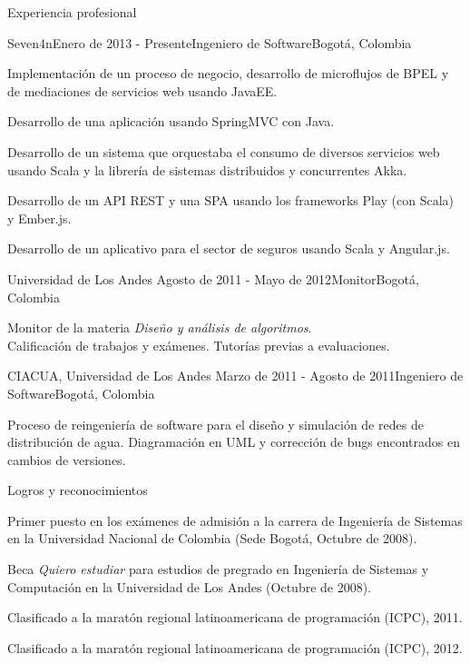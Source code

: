 \documentclass{resume} %
\def\uniandes{Universidad de Los Andes }
\begin{document}
\begin{rSection}{Experiencia profesional}

\begin{rSubsection}{Seven4n}{Enero de 2013 - Presente}{Ingeniero de Software}{Bogot\'a, Colombia}
\item Implementaci\'on de un proceso de negocio, desarrollo de microflujos de BPEL y de mediaciones de servicios web usando JavaEE.
\item Desarrollo de una aplicación usando SpringMVC con Java. 
\item Desarrollo de un sistema que orquestaba el consumo de diversos servicios web usando Scala y la librer\'ia de sistemas distribuidos y concurrentes Akka.
\item Desarrollo de un API REST y una SPA usando los frameworks Play (con Scala) y Ember.js. 
\item Desarrollo de un aplicativo para el sector de seguros usando Scala y Angular.js.
\end{rSubsection}


\begin{rSubsection}{\uniandes}{Agosto de 2011 - Mayo de 2012}{Monitor}{Bogot\'a, Colombia}
\item Monitor de la materia \textit{Dise\~{n}o y an\'alisis de algoritmos}.\\
Calificaci\'on de trabajos y ex\'amenes. Tutor\'ias previas a evaluaciones.
\end{rSubsection}


\begin{rSubsection}{CIACUA, \uniandes}{Marzo de 2011 - Agosto de 2011}{Ingeniero de Software}{Bogot\'a, Colombia}
\item Proceso de reingenier\'ia de software para el dise\~{n}o y simulaci\'on de redes de distribuci\'on de agua. Diagramaci\'on en UML y correcci\'on de bugs encontrados en cambios de versiones.
\end{rSubsection}

\end{rSection}

\begin{rSection}{Logros y reconocimientos}
\begin{rSubsection}{}{}{}{}
\item Primer puesto en los ex\'amenes de admisi\'on a la carrera de Ingenier\'ia de Sistemas en la Universidad Nacional de Colombia (Sede Bogot\'a, Octubre de 2008).
\item Beca \textsl{Quiero estudiar} para estudios de pregrado en Ingenier\'ia de Sistemas y Computaci\'on en la Universidad de Los Andes (Octubre de 2008).
\item Clasificado a la marat\'on regional latinoamericana de programaci\'on (ICPC), 2011.
\item Clasificado a la marat\'on regional latinoamericana de programaci\'on (ICPC), 2012.
\end{rSubsection}
\end{rSection}
\end{document}
